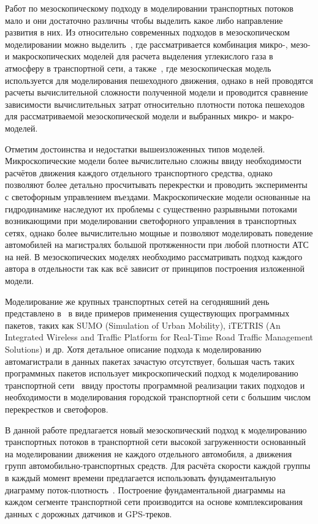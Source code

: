 Работ по мезоскопическому подходу в моделировании транспортных потоков мало и они достаточно различны чтобы выделить какое либо направление развития в них.
Из относительно современных подходов в мезоскопическом моделировании можно выделить~\autocite{oskarbski2018applying}, где рассматривается комбинация микро-, мезо- и макроскопических моделей для расчета выделения углекислого газа в атмосферу в транспортной сети, а также~\autocite{tordeux2018mesoscopic}, где мезоскопическая модель используется для моделирования пешеходного движения, однако в ней проводятся расчеты вычислительной сложности полученной модели и проводится сравнение зависимости вычислительных затрат относительно плотности потока пешеходов для рассматриваемой мезоскопической модели и выбранных микро- и макро- моделей.

Отметим достоинства и недостатки вышеизложенных типов моделей.
Микроскопические модели более вычислительно сложны ввиду необходимости расчётов движения каждого отдельного транспортного средства, однако позволяют более детально просчитывать перекрестки и проводить эксперименты с светофорным управлением въездами.
Макроскопические модели основанные на гидродинамике наследуют их проблемы с существенно разрывными потоками возникающими при моделировании светофорного управления в транспортных сетях, однако более вычислительно мощные и позволяют моделировать поведение автомобилей на магистралях большой протяженности при любой плотности АТС на ней.
В мезоскопических моделях необходимо рассматривать подход каждого автора в отдельности так как всё зависит от принципов построения изложенной модели.

Моделирование же крупных транспортных сетей на сегодняшний день представлено в~\autocite{asano2015traffic, bieker2015traffic} в
виде примеров применения существующих программных пакетов, таких как SUMO (Simulation of Urban Mobility),
iTETRIS (An Integrated Wireless and Traffic Platform for Real-Time Road Traffic Management Solutions) и др.
Хотя детальное описание подхода к моделированию автомагистрали в данных пакетах зачастую отсутствует, большая часть таких программных пакетов использует микроскопический подход к моделированию транспортной сети~\autocite{ratrout2009comparative} ввиду простоты программной реализации таких подходов и необходимости в моделирования городской транспортной сети с большим числом перекрестков и светофоров.

В данной работе предлагается новый мезоскопический подход к моделированию транспортных потоков в транспортной сети высокой загруженности основанный на моделировании движения не каждого отдельного автомобиля, а движения групп автомобильно-транспортных средств.
Для расчёта скорости каждой группы в каждый момент времени предлагается использовать фундаментальную диаграмму поток-плотность~\autocite{collectiveArticle2}.
Построение фундаментальной диаграммы на каждом сегменте транспортной сети производится на основе комплексирования данных с дорожных датчиков и GPS-треков.


